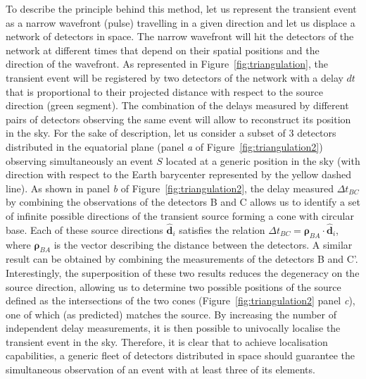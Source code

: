 \documentclass[]{spie}  %
\renewcommand\vec{\bm}
\begin{document}
To describe the principle behind this method, let us represent the transient event as a narrow wavefront (pulse) travelling in a given direction and let us displace a network of detectors in space. The narrow wavefront will hit the detectors of the network at different times that depend on their spatial positions and the direction of the wavefront. As represented in Figure~\ref{fig:triangulation}, the transient event will be registered by two detectors of the network with a delay $dt$ that is proportional to their projected distance with respect to the source direction (green segment). The combination of the delays measured by different pairs of detectors observing the same event will allow to reconstruct its position in the sky. For the sake of description, let us consider a subset of 3 detectors distributed in the equatorial plane (panel \emph{a} of Figure~\ref{fig:triangulation2}) observing simultaneously an event $S$ located at a generic position in the sky (with direction with respect to the Earth barycenter represented by the yellow dashed line). As shown in panel \emph{b} of Figure~\ref{fig:triangulation2}, the delay measured $\Delta t_{BC}$ by combining the observations of the detectors B and C allows us to identify a set of infinite possible directions of the transient source forming a cone with circular base. Each of these source directions $\hat{\vec{d}}_i$ satisfies the relation $\Delta t_{BC}=\vec{\rho}_{BA}\cdot \hat{\vec{d}}_i$, where $\vec{\rho}_{BA}$ is the vector describing the distance between the detectors. A similar result can be obtained by combining the measurements of the detectors B and C'. Interestingly, the superposition of these two results reduces the degeneracy on the source direction, allowing us to determine two possible positions of the source defined as the intersections of the two cones (Figure~\ref{fig:triangulation2} panel \emph{c}), one of which (as predicted) matches the source. By increasing the number of independent delay measurements, it is then possible to univocally localise the transient event in the sky. Therefore, it is clear that to achieve localisation capabilities, a generic fleet of detectors distributed in space should guarantee the simultaneous observation of an event with at least three of its elements.    
\end{document}
